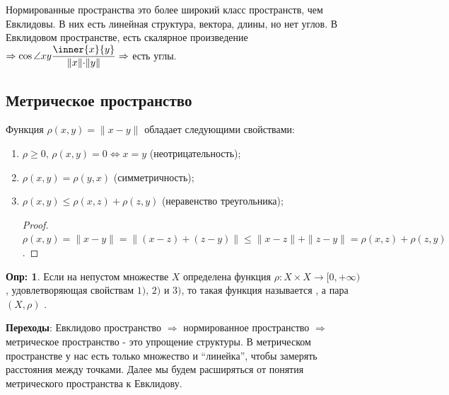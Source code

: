 \documentclass[12pt]{article}
\theoremstyle{definition}
\newtheorem{defn}{Опр:}
\begin{document}
Нормированные пространства это более широкий класс пространств, чем Евклидовы. В них есть линейная структура, вектора, длины, но нет углов. В Евклидовом пространстве, есть скалярное произведение $\Rightarrow \cos{\angle{xy}}\dfrac{\inner{x}{y}}{\|x\|{\cdot}\|y\|}\Rightarrow$ есть углы. 

\subsection*{Метрическое пространство}
Функция $\rho(x,y) = \|x-y\|$ обладает следующими свойствами:

\begin{enumerate}[label={\arabic*)}]
	\item $\rho \geq 0, \, \rho(x,y) = 0 \Leftrightarrow x = y$ (неотрицательность);
	\item $\rho(x,y) = \rho(y,x)$ (симметричность);
	\item $\rho(x,y) \leq \rho(x,z) + \rho(z,y)$ (неравенство треугольника);
	\begin{proof}
		$\rho(x,y) = \|x-y\| = \|(x-z) + (z-y)\| \leq \|x-z\| + \|z-y\| = \rho(x,z) + \rho(z,y)$.
	\end{proof}
\end{enumerate}

\begin{defn}
	Если на непустом множестве $X$ определена функция $\rho \colon X \times X \to [0, +\infty)$, удовлетворяющая свойствам $1),\,2)$ и $3)$, то такая функция называется , а пара $(X,\rho)$ .
\end{defn}

\textbf{Переходы}: Евклидово пространство $\Rightarrow$ нормированное пространство $\Rightarrow$ метрическое пространство - это упрощение структуры. В метрическом пространстве у нас есть только множество и ``линейка'', чтобы замерять расстояния между точками. Далее мы будем расширяться от понятия метрического пространства к Евклидову.
\end{document}

